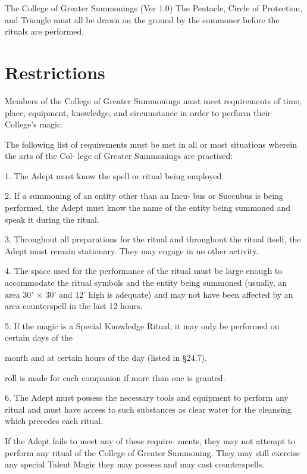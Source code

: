 \begin{Chapter}{The College of Greater Summonings (Ver 1.0)}
The  Pentacle,  Circle  of  Protection,  and  Triangle 
must all be drawn on the ground by the summoner 
before the rituals are performed. 

\section{Restrictions}

Members of the College of Greater Summonings must meet requirements of
time, place, equipment, knowledge, and circumstance in order to
perform their College’s magic.

The  following  list  of  requirements  must be  met  in 
all  or  most  situations  wherein  the  arts  of  the  Col-
lege of Greater Summonings are practised: 

1.  The  Adept  must  know  the  spell  or  ritual  being 
employed. 

2. If a summoning of an entity other than an Incu-
bus  or  Succubus  is  being  performed,  the  Adept 
must know the name of the entity being summoned 
and speak it during the ritual. 

3.  Throughout  all  preparations  for  the  ritual  and 
throughout the ritual itself, the Adept must remain 
stationary. They may engage in no other activity. 

4. The space used for the performance of the ritual 
must  be  large  enough  to  accommodate  the  ritual 
symbols  and  the  entity  being  summoned  (usually, 
an  area  30’  ×  30’  and  12’  high  is  adequate)  and 
may not have been affected by an area counterspell 
in the last 12 hours. 

5.  If  the  magic  is  a  Special  Knowledge  Ritual,  it 
may  only  be  performed  on  certain  days  of  the 

month  and  at  certain  hours  of  the  day  (listed  in 
§24.7). 

roll is made for each companion if more than one is 
granted. 

6. The Adept must possess the necessary tools and 
equipment  to  perform  any  ritual  and  must  have 
access  to  such  substances  as  clear  water  for  the 
cleansing which precedes each ritual. 

If  the  Adept  fails  to  meet  any  of  these  require-
ments, they  may  not  attempt to  perform any  ritual 
of  the  College  of  Greater  Summoning.  They  may 
still  exercise  any  special  Talent  Magic  they  may 
possess and may cast counterspells. 


\end{Chapter}
